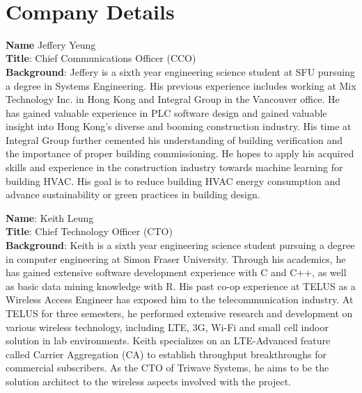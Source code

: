 \
\setcounter{section}{5}
\section{Company Details}

\bigskip
\textbf{Name} Jeffery Yeung \\
\medskip
\textbf{Title}: Chief Communications Officer (CCO)\\
\medskip
\textbf{Background}:
Jeffery is a sixth year engineering science student at SFU pursuing a degree in Systems Engineering. His previous experience includes 
working at Mix Technology Inc. in Hong Kong and Integral Group in the Vancouver office. He has gained valuable experience in PLC software
design and gained valuable insight into Hong Kong's diverse and booming construction industry. His time at Integral Group further cemented
his understanding of building verification and the importance of proper building commissioning. He hopes to apply his acquired skills and experience
in the construction industry towards machine learning for building HVAC. His goal is to reduce building HVAC energy consumption and 
advance sustainability or green practices in building design.

\bigskip
\bigskip
\textbf{Name}:  Keith Leung\\
\medskip
\textbf{Title}: Chief Technology Officer (CTO) \\
\medskip
\textbf{Background}:
Keith is a sixth year engineering science student pursuing a degree in computer engineering at Simon Fraser University. Through his academics, he has gained extensive software development experience with C and C++, as well as basic data mining knowledge with R. His past co-op experience at TELUS as a Wireless Access Engineer has exposed him to the telecommunication industry. At TELUS for three semesters, he performed extensive research and development on various wireless technology, including LTE, 3G, Wi-Fi and small cell indoor solution in lab environments. Keith specializes on an LTE-Advanced feature called Carrier Aggregation (CA) to establish throughput breakthroughs for commercial subscribers. As the CTO of Triwave Systems, he aims to be the solution architect to the wireless aspects involved with the project.

